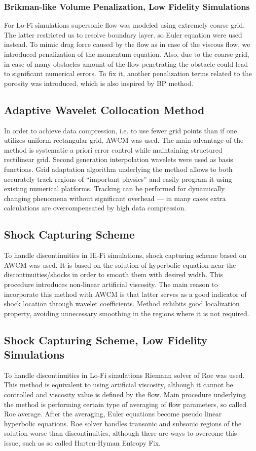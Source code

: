\subsubsection{Brikman-like Volume Penalization, Low Fidelity Simulations}
For Lo-Fi simulations supersonic flow was modeled using extremely coarse grid. The latter restricted us to resolve boundary layer, so Euler equation were used instead. To mimic drag force caused by the flow as in case of the viscous flow, we introduced penalization of the momentum equation. Also, due to the coarse grid, in case of many obstacles amount of the flow penetrating the obstacle could lead to significant numerical errors. To fix it, another penalization terms related to the porosity was introduced, which is also inspired by BP method.

\subsection{Adaptive Wavelet Collocation Method}
In order to achieve data compression, i.e. to use fewer grid points than if one utilizes uniform rectangular grid, AWCM was used. The main advantage of the method is systematic a priori error control while maintaining structured rectilinear grid. Second generation interpolation wavelets were used as basis functions. Grid adaptation algorithm underlying the method allows to both accurately track regions of ``important physics'' and easily program it using existing numerical platforms. Tracking can be performed for dynamically changing phenomena without significant overhead --- in many cases extra calculations are overcompensated by high data compression.

\subsection{Shock Capturing Scheme}
To handle discontinuities in Hi-Fi simulations, shock capturing scheme based on AWCM was used. It is based on the solution of hyperbolic equation near the discontinuities/shocks in order to smooth them with desired width. This procedure introduces non-linear artificial viscosity. The main reason to incorporate this method with AWCM is that latter serves as a good indicator of shock location through wavelet coefficients. Method exhibits good localization property, avoiding unnecessary smoothing in the regions where it is not required. 

\subsection{Shock Capturing Scheme, Low Fidelity Simulations}
To handle discontinuities in Lo-Fi simulations Riemann solver of Roe was used. This method is equivalent to using artificial viscosity, although it cannot be controlled and viscosity value is defined by the flow. Main procedure underlying the method is performing certain type of averaging of flow parameters, so called Roe average. After the averaging, Euler equations become pseudo linear hyperbolic equations. Roe solver handles transonic and subsonic regions of the solution worse than discontinuities, although there are ways to overcome this issue, such as so called Harten-Hyman Entropy Fix.

